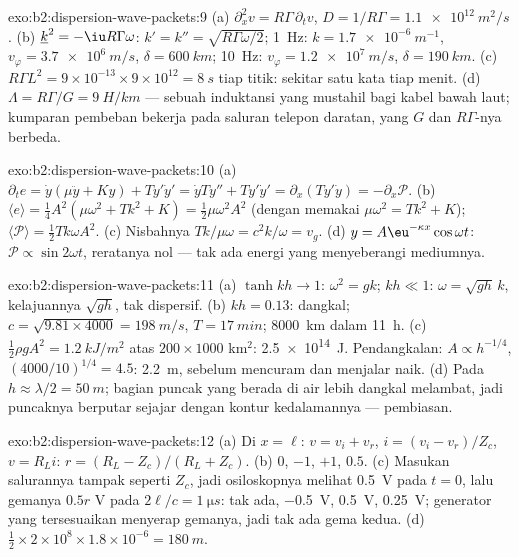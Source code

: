 \begin{solution}{exo:b2:dispersion-wave-packets:9}
(a) $\partial_x^2v = R\Gamma\,\partial_tv$, $D = 1/R\Gamma = \qty{1.1e12}{m^2/s}$. (b) $\underline k^2
= -\iu R\Gamma\omega$: $k' = k'' = \sqrt{R\Gamma\omega/2}$; \qty{1}{Hz}: $k = \qty{1.7e-6}{m^{-1}}$,
$v_\varphi = \qty{3.7e6}{m/s}$, $\delta = \qty{600}{km}$; \qty{10}{Hz}: $v_\varphi = \qty{1.2e7}{m/s}$,
$\delta = \qty{190}{km}$. (c) $R\Gamma L^2 = 9 \times 10^{-13} \times 9 \times 10^{12} = \qty{8}{s}$
tiap titik: sekitar satu kata tiap menit. (d) $\Lambda = R\Gamma/G = \qty{9}{H/km}$ --- sebuah
induktansi yang mustahil bagi kabel bawah laut; kumparan pembeban bekerja pada
saluran telepon daratan, yang $G$ dan $R\Gamma$-nya berbeda.
\end{solution}

\begin{solution}{exo:b2:dispersion-wave-packets:10}
(a) $\partial_te = \dot y(\mu\ddot y + Ky) + Ty'\dot y' = \dot yTy'' + Ty'\dot y' = \partial_x
(Ty'\dot y) = -\partial_x\mathcal P$. (b) $\langle e\rangle = \tfrac14A^2(\mu\omega^2 + Tk^2 + K) =
\tfrac12\mu\omega^2A^2$ (dengan memakai $\mu\omega^2 = Tk^2 + K$); $\langle\mathcal P\rangle = \tfrac12Tk\omega
A^2$. (c) Nisbahnya $Tk/\mu\omega = c^2k/\omega = v_g$. (d) $y = A\eu^{-\kappa x}\cos\omega t$:
$\mathcal P \propto \sin2\omega t$, reratanya nol --- tak ada energi yang menyeberangi mediumnya.
\end{solution}

\begin{solution}{exo:b2:dispersion-wave-packets:11}
(a) $\tanh kh \to 1$: $\omega^2 = gk$; $kh \ll 1$: $\omega = \sqrt{gh}\,k$, kelajuannya $\sqrt{gh}$,
tak dispersif. (b) $kh = 0.13$: dangkal; $c = \sqrt{9.81 \times 4000} = \qty{198}{m/s}$,
$T = \qty{17}{min}$; \qty{8000}{km} dalam \qty{11}{h}. (c) $\tfrac12\rho gA^2 = \qty{1.2}{kJ/m^2}$
atas $200 \times 1000$ km$^2$: \qty{2.5e14}{J}. Pendangkalan: $A \propto h^{-1/4}$, $(4000/10)^{1/4}
= 4.5$: \qty{2.2}{m}, sebelum mencuram dan menjalar naik. (d) Pada $h \approx \lambda/2 =
\qty{50}{m}$; bagian puncak yang berada di air lebih dangkal melambat, jadi
puncaknya berputar sejajar dengan kontur kedalamannya --- pembiasan.
\end{solution}

\begin{solution}{exo:b2:dispersion-wave-packets:12}
(a) Di $x = \ell$: $v = v_i + v_r$, $i = (v_i - v_r)/Z_c$, $v = R_Li$: $r = (R_L -
Z_c)/(R_L + Z_c)$. (b) $0$, $-1$, $+1$, $0.5$. (c) Masukan salurannya tampak seperti
$Z_c$, jadi osiloskopnya melihat \qty{0.5}{V} pada $t = 0$, lalu gemanya $0.5r$ V pada
$2\ell/c = \qty{1}{\micro s}$: tak ada, \qty{-0.5}{V}, \qty{+0.5}{V}, \qty{+0.25}{V};
generator yang tersesuaikan menyerap gemanya, jadi tak ada gema kedua. (d)
$\tfrac12 \times 2 \times 10^8 \times 1.8 \times 10^{-6} = \qty{180}{m}$.
\end{solution}

